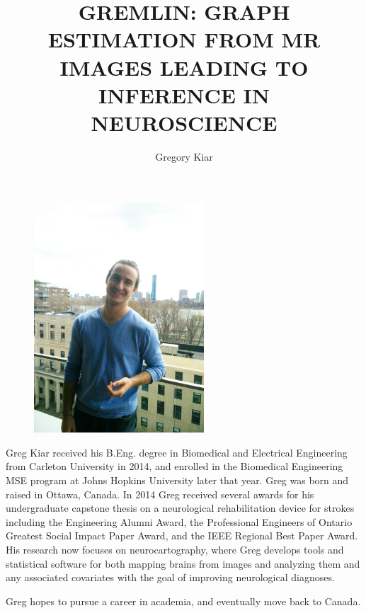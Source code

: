 \documentclass[12pt,oneside,final]{thesis}
\begin{document}
\title{GREMLIN: GRAPH ESTIMATION FROM MR IMAGES LEADING TO INFERENCE IN NEUROSCIENCE}
\author{Gregory Kiar}
\thesis
\masterscienceeng
\copyrightnotice











\begin{vita}
\begin{figure}
\includegraphics[width=2.5in,clip,keepaspectratio]{gkheadshot}
\end{figure}
Greg Kiar received his B.Eng. degree in Biomedical and Electrical Engineering 
from Carleton University in 2014, and enrolled in the Biomedical Engineering 
MSE program at Johns Hopkins University later that year. Greg was born and raised in Ottawa, Canada. In 2014 Greg received several awards for his undergraduate capstone thesis on a neurological rehabilitation device for strokes including the Engineering Alumni Award, the Professional Engineers of Ontario Greatest Social Impact Paper Award, and the IEEE Regional Best Paper Award. His research now focuses on neurocartography, where Greg develops tools and statistical software for both mapping brains from images and analyzing them and any associated covariates with the goal of improving neurological diagnoses.

Greg hopes to pursue a career in academia, and eventually move back to Canada.
\end{vita}
\end{document}
